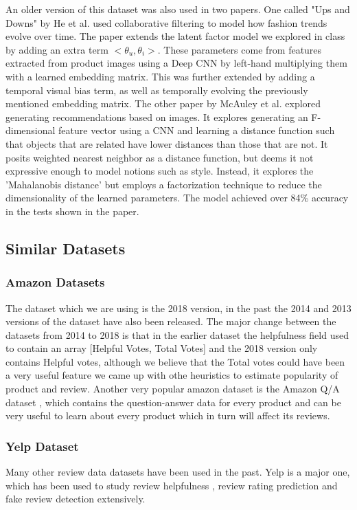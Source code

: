 \documentclass[final]{cvpr}
\begin{document}
An older version of this dataset was also used in two papers. One called "Ups and Downs" by He et al. used collaborative filtering to model how fashion trends evolve over time. The paper extends the latent factor model we explored in class by adding an extra term $<\theta_{u},\theta_{i}>$. These parameters come from features extracted from product images using a Deep CNN by left-hand multiplying them with a learned embedding matrix. This was further extended by adding a temporal visual bias term, as well as temporally evolving the previously mentioned embedding matrix\cite{He}. The other paper by McAuley et al. explored generating recommendations based on images. It explores generating an F-dimensional feature vector using a CNN and learning a distance function such that objects that are related have lower distances than those that are not. It posits weighted nearest neighbor as a distance function, but deems it not expressive enough to model notions such as style. Instead, it explores the 'Mahalanobis distance' but employs a factorization technique to reduce the dimensionality of the learned parameters. The model achieved over 84\% accuracy in the tests shown in the paper\cite{McAuley}.

\subsection{Similar Datasets}

\subsubsection{Amazon Datasets}
The dataset which we are using is the 2018 version, in the past the 2014 and 2013 versions of the dataset have also been released. The major change between the datasets from 2014 to 2018 is that in the earlier dataset the helpfulness field used to contain an array [Helpful Votes, Total Votes] and the 2018 version only contains Helpful votes, although we believe that the Total votes could have been a very useful feature we came up with othe heuristics to estimate popularity of product and review.
Another very popular amazon dataset is the Amazon Q/A dataset \cite{amazon2}, which contains the question-answer data for every product and can be very useful to learn about every product which in turn will affect its reviews.

\subsubsection{Yelp Dataset}
Many other review data datasets have been used in the past. Yelp is a major one, which has been used to study review helpfulness \cite{zheng}, review rating prediction and fake review detection \cite{arjun} extensively. 
\end{document}
